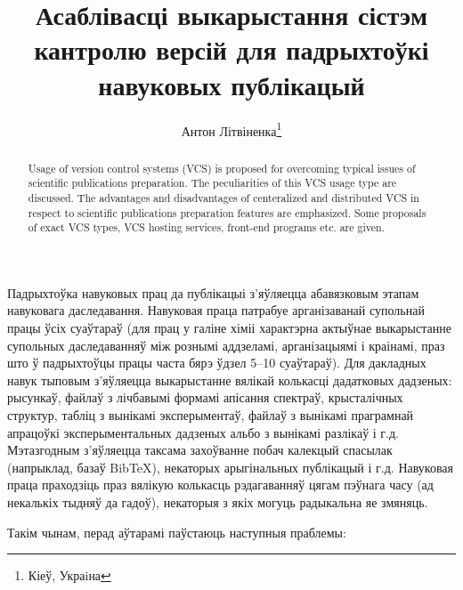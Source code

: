 \documentclass[10pt, a5paper]{article}
\begin{document}
\title{Асаблівасці выкарыстання сістэм кантролю версій для падрыхтоўкі навуковых публікацый}%

\author{Антон Літвіненка\footnote{Кіеў, Украiна}}
\maketitle

\begin{abstract}
Usage of version control systems (VCS) is proposed for overcoming typical issues of scientific publications preparation. The peculiarities of this VCS usage type are discussed. The advantages and disadvantages of centeralized and distributed VCS in respect to scientific publications preparation features are emphasized. Some proposals of exact VCS types, VCS hosting services, front-end programs etc. are given.
\end{abstract}

Падрыхтоўка навуковых прац да публікацыі з'яўляецца абавязковым этапам навуковага даследавання. Навуковая праца патрабуе арганізаванай супольнай працы ўсіх суаўтараў (для прац у галіне хіміі характэрна актыўнае выкарыстанне супольных даследаванняў між рознымі аддзеламі, арганізацыямі і краінамі, праз што ў падрыхтоўцы працы часта бярэ ўдзел 5--10 суаўтараў). Для дакладных навук тыповым з'яўляецца выкарыстанне вялікай колькасці дадатковых дадзеных: рысункаў, файлаў з лічбавымі формамі апісання спектраў, крысталічных структур, табліц з вынікамі эксперыментаў, файлаў з вынікамі праграмнай апрацоўкі эксперыментальных дадзеных альбо з вынікамі разлікаў і г.д. Мэтазгодным з'яўляецца таксама захоўванне побач калекцый спасылак (напрыклад, базаў BibTeX), некаторых арыгінальных публікацый і г.д. Навуковая праца праходзіць праз вялікую колькасць рэдагаванняў цягам пэўнага часу (ад некалькіх тыдняў да гадоў), некаторыя з якіх могуць радыкальна яе змяняць.

Такім чынам, перад аўтарамі паўстаюць наступныя праблемы:
\end{document}

